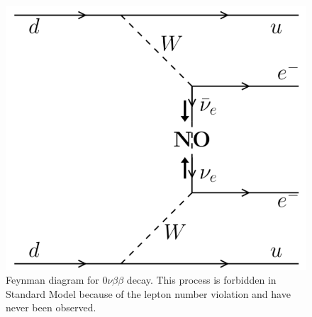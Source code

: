 \documentclass[main.tex]{subfiles}
\begin{document}
\begin{figure}[h!]
\begin{center}
\includegraphics[scale=0.20]{pictures/Chap2/0nubb_Feynman.png}
\caption{Feynman diagram for 0$\nu\beta\beta$ decay. This process is forbidden in Standard Model because of the lepton number violation and have never been observed.}
\label{0nubbFeynman}
\end{center}
\end{figure}
\end{document}

